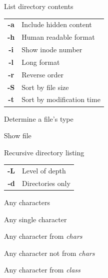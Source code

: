 \documentclass[12pt, a4paper]
{article}
\begin{document}
\begin{multicols}{3}
		\begin{description}[nolistsep]
			\item[ls] List directory contents
			\item
			\begin{tabular}{cl}
				{\large \ttfamily \textbf{-a}} & Include hidden content \\
				{\large \ttfamily \textbf{-h}} & Human readable format\\
				{\large \ttfamily \textbf{-i}} & Show inode number\\
				{\large \ttfamily \textbf{-l}} & Long format \\
				{\large \ttfamily \textbf{-r}} & Reverse order \\
				{\large \ttfamily \textbf{-S}} & Sort by file size \\
				{\large \ttfamily \textbf{-t}} & Sort by modification time\\
			\end{tabular}
			\item[file] Determine a file's type
			\item[less] Show file
			\item[tree] Recursive  directory listing
			\item
			\begin{tabular}{cl}
				{\large \ttfamily \textbf{-L}} & Level of depth \\
				{\large \ttfamily \textbf{-d}} & Directories only\\
			\end{tabular}
		\end{description}
		
		
		
		\begin{description}[nolistsep]
			\item[*] Any characters
			\item[?] Any single character
			\item[{[\large \textit{chars}}{\Large]}] Any character from \textit{chars}
			\item[{[\large!\textit{chars}}{\Large]}] Any character not from \textit{chars}
			\item[{[\large:\textit{class}:}{\Large]}] Any character from \textit{class}
		\end{description}
		
		

\end{multicols}
\end{document}
